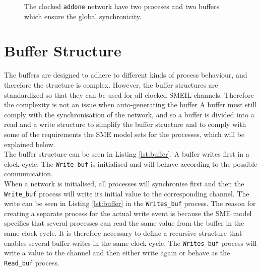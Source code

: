 \begin{figure}
\centering
{}
\caption{The clocked \texttt{addone} network have two proceses and two buffers which ensure the global synchronicity.}
\label{fig:addone_clocked}
\end{figure}
\section{Buffer Structure}
The buffers are designed to adhere to different kinds of process behaviour, and therefore the structure is complex. However, the buffer structures are standardized so that they can be used for all clocked SMEIL channels. Therefore the complexity is not an issue when auto-generating the buffer A buffer must still comply with the synchronisation of the network, and so a buffer is divided into a read and a write structure to simplify the buffer structure and to comply with some of the requirements the SME model sets for the processes, which will be explained below. \\

The buffer structure can be seen in Listing \ref{lst:buffer}.
A buffer writes first in a clock cycle. The \texttt{Write\_buf} is initialised and will behave according to the possible communication.\\

When a network is initialised, all processes will synchronise first and then the \texttt{Write\_buf} process will write its initial value to the corresponding channel. The write can be seen in Listing \ref{lst:buffer} in the \texttt{Writes\_buf} process. The reason for creating a separate process for the actual write event is because the SME model specifies that several processes can read the same value from the buffer in the same clock cycle. It is therefore necessary to define a recursive structure that enables several buffer writes in the same clock cycle. The \texttt{Writes\_buf} process will write a value to the channel and then either write again or behave as the \texttt{Read\_buf} process.\\

